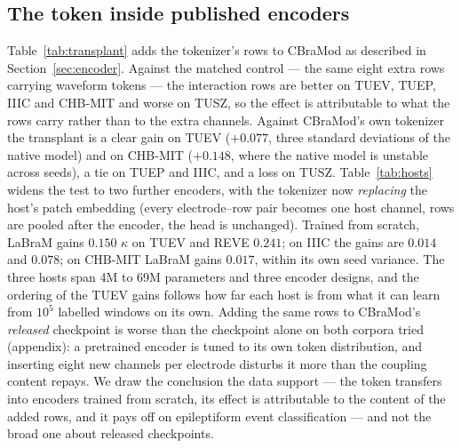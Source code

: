 \subsection{The token inside published encoders}
\label{sec:transplant}

Table~\ref{tab:transplant} adds the tokenizer's rows to CBraMod as
described in Section~\ref{sec:encoder}. Against the matched control ---
the same eight extra rows carrying waveform tokens --- the interaction
rows are better on TUEV, TUEP, IIIC and CHB-MIT and worse on TUSZ, so
the effect is attributable to what the rows carry rather than to the
extra channels. Against CBraMod's own tokenizer the transplant is a clear
gain on TUEV ($+0.077$, three standard deviations of the native model) and
on CHB-MIT ($+0.148$, where the native model is unstable across seeds), a
tie on TUEP and IIIC, and a loss on TUSZ.
Table~\ref{tab:hosts} widens the test to two further encoders, with
the tokenizer now \emph{replacing} the host's patch embedding (every
electrode--row pair becomes one host channel, rows are pooled after the
encoder, the head is unchanged). Trained from scratch, LaBraM gains
$0.150$ $\kappa$ on TUEV and REVE $0.241$; on IIIC the gains are
$0.014$ and $0.078$; on CHB-MIT LaBraM gains $0.017$, within its own
seed variance. The three hosts span 4M to 69M parameters and three
encoder designs, and the ordering of the TUEV gains follows how far each
host is from what it can learn from $10^5$ labelled windows on its own.
Adding the same rows to CBraMod's \emph{released} checkpoint is worse
than the checkpoint alone on both corpora tried (appendix): a pretrained
encoder is tuned to its own token distribution, and inserting eight new
channels per electrode disturbs it more than the coupling content
repays. We draw the conclusion the data support --- the token transfers
into encoders trained from scratch, its effect is attributable to the
content of the added rows, and it pays off on epileptiform event
classification --- and not the broad one about released checkpoints.

